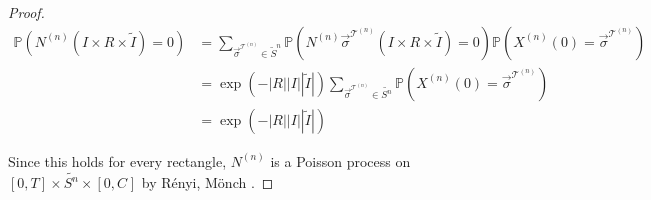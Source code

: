 \documentclass[12pt]{article}
\newcommand{\mb}{\mathbb}
\newcommand{\mc}{\mathcal}
\newcommand{\pr}{\mb{P}}							%
\renewcommand{\S}{S}							%
\newcommand{\s}{\sigma}							%
\newcommand{\sv}{\vec{\s}}						%
\newcommand{\X}{X}								%
\newcommand{\carp}[1]{^{#1}}					%
\newcommand{\vsi}[1]{^{#1}}						%
\newcommand{\cind}[1]{_{#1}}					%
\newcommand{\tp}[1]{(#1)}						%
\newcommand{\const}{C}							%
\newcommand{\tree}{\mc{T}}						%
\newcommand{\sln}[1]{^{(#1)}}					%
\newcommand{\poiss}{N}							%
\newcommand{\alt}[1]{\widetilde{#1}}			%
\newcommand{\indx}[1]{_{#1}}					%
\newcommand{\inte}{I}							%
\begin{document}
\begin{proof}
\begin{align*}
\pr\left(\poiss\sln{n}\left(\inte\times R\times \alt{\inte}\right) = 0\right) &= \sum_{\sv\cind{}\vsi{\tree\sln{n}} \in \alt{\S}^n} \pr\left(\poiss\sln{n}{\sv\cind{}\vsi{\tree\sln{n}}}\left(\inte\times R\times \alt{\inte}\right) = 0\right)\pr(\X\sln{n}\cind{}\tp{0} = \sv\cind{}\vsi{\tree\sln{n}})\\
&= \exp\left(-|R| |\inte||\alt{\inte}|\right)\sum_{\sv\cind{}\vsi{\tree\sln{n}} \in \alt{\S\carp{n}}} \pr(\X\sln{n}\cind{}\tp{0} = \sv\cind{}\vsi{\tree\sln{n}})\\
&=\exp\left(-|R| |\inte||\alt{\inte}|\right)
\end{align*}

Since this holds for every rectangle, \(\poiss\sln{n}\) is a Poisson process on \([0,T]\times \alt{\S\carp{n}}\times [0,\const\indx{}]\) by R\'enyi, M\"onch \cite[Theorem 9.2.XII]{DalVer08}.



\end{proof}
\newpage


\end{document}
